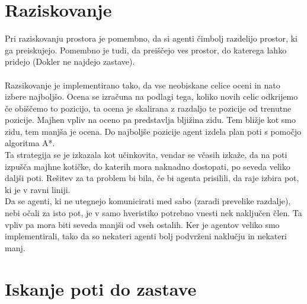 \documentclass[12pt,a4paper,openany]{book}
\begin{document}
\section{Raziskovanje}
Pri raziskovanju prostora je pomembno, da si agenti čimbolj razdelijo prostor, ki ga preiskujejo. Pomembno je tudi,
da preiščejo ves prostor, do katerega lahko pridejo (Dokler ne najdejo zastave).\\
\\
Razsikovanje je implementirano tako, da vse neobiskane celice oceni in nato izbere najboljšo. Ocena se izračuna na 
podlagi tega, koliko novih celic odkrijemo če obiščemo to pozicijo, ta ocena je skalirana z razdaljo te pozicije od 
trenutne pozicije. Majhen vpliv na oceno pa predstavlja bljižina zidu. Tem bližje kot smo zidu, tem manjša je ocena. 
Do najboljše pozicije agent izdela plan poti s pomočjo algoritma A*.\\
Ta strategija se je izkazala kot učinkovita, vendar se včasih izkaže, da na poti izpušča majhne kotičke, do katerih 
mora naknadno dostopati, po seveda veliko daljši poti. Rešitev za ta problem bi bila, če bi agenta prisilili, da raje 
izbira pot, ki je v ravni liniji.\\
Da se agenti, ki ne utegnejo komunicirati med sabo (zaradi prevelike razdalje), nebi očali za isto pot, je v samo 
hveristiko potrebno vnesti nek naključen člen. Ta vpliv pa mora biti seveda manjši od vseh ostalih. Ker je 
agentov veliko smo implementirali, tako da so nekateri agenti bolj podvrženi naklučju in nekateri manj.

\section{Iskanje poti do zastave}
\end{document}
